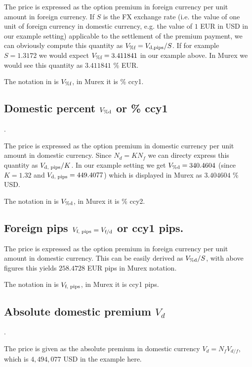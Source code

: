 \documentclass{amsart}
\theoremstyle{plain}
\numberwithin{equation}{section}
\begin{document}
The price is expressed as the option premium in foreign currency per unit amount in foreign currency. If $S$ is the
FX exchange rate (i.e. the value of one unit of foreign currency in domestic currency, e.g. the value of $1$ EUR in USD in
our example setting) applicable to the settlement of the premium payment, we can obviously compute this quantity as
$V_{\%\textnormal{f}} = V_{\textnormal{d,pips}} / S$. If for example $S = 1.3172$ we would expect $V_{\%\textnormal{f}} = 3.411841$ in our example above. In
Murex we would see this quantity as $3.411841$ \% EUR.

The notation in \cite{Clark} is $V_{\%\textnormal{f}}$, in Murex it is \% ccy1.


\subsection{Domestic percent $V_{\%\textnormal{d}}$ or \% ccy1}.

The price is expressed as the option premium in domestic currency per unit amount in domestic currency. Since
$N_d = K N_f$ we can directy express this quantity as $V_{\textnormal{d, pips}} / K$. In our example setting we get
$V_{\%\textnormal{d}} = 340.4604$ (since $K=1.32$ and $V_{\textnormal{d, pips}} = 449.4077$) which is displayed in Murex as 
$3.404604$ \% USD.

The notation in \cite{Clark} is $V_{\%\textnormal{d}}$, in Murex it is \% ccy2.

\subsection{Foreign pips $V_{\textnormal{f, pips}} = V_{\textnormal{f/d}}$ or ccy1 pips.}

The price is expressed as the option premium in foreign currency per unit amount in domestic currency. This can be
easily derived as $V_{\%\textnormal{d}} / S$, with above figures this yields $258.4728$ EUR pips in Murex notation.

The notation in \cite{Clark} is $V_{\textnormal{f, pips}}$, in Murex it is ccy1 pips.

\subsection{Absolute domestic premium $V_d$}.

The price is given as the absolute premium in domestic currency $V_d = N_f V_{d/f}$, which is $4,494,077$ USD in
the example here.
\end{document}

